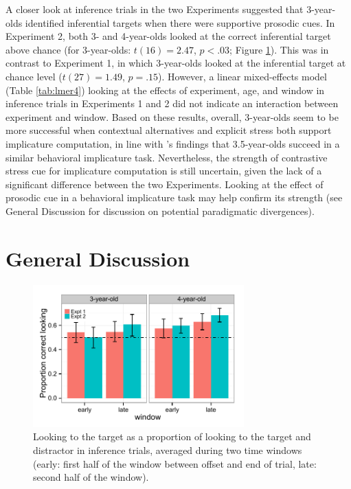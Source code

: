 \documentclass[10pt,letterpaper]{article}
\begin{document}
A closer look at inference trials in the two Experiments suggested that 3-year-olds identified inferential targets when there were supportive prosodic cues. In Experiment 2, both 3- and 4-year-olds looked at the correct inferential target above chance (for 3-year-olds: $t(16) = 2.47$, $p < .03$; Figure \ref{fig:0prosbar}). This was in contrast to Experiment 1, in which 3-year-olds looked at the inferential target at chance level ($t(27) = 1.49$, $p = .15$). However, a linear mixed-effects model (Table \ref{tab:lmer4}) looking at the effects of experiment, age, and window in inference trials in Experiments 1 and 2 did not indicate an interaction between experiment and window. Based on these results, overall, 3-year-olds seem to be more successful when contextual alternatives and explicit stress both support implicature computation, in line with 's findings that 3.5-year-olds succeed in a similar behavioral implicature task. Nevertheless, the strength of contrastive stress cue for implicature computation is still uncertain, given the lack of a significant difference between the two Experiments. Looking at the effect of prosodic cue in a behavioral implicature task may help confirm its strength (see General Discussion for discussion on potential paradigmatic divergences). 

\section{General Discussion}

\begin{figure}[t]
\begin{center} 
\includegraphics[width=3.2in]{figures/expt12-accuracy_inf.pdf}
\caption{\label{fig:0prosbar} Looking to the target as a proportion of looking to the target and distractor in inference trials, averaged during two time windows (early: first half of the window between offset and end of trial, late: second half of the window).}
\end{center} 
\end{figure}
\end{document}
